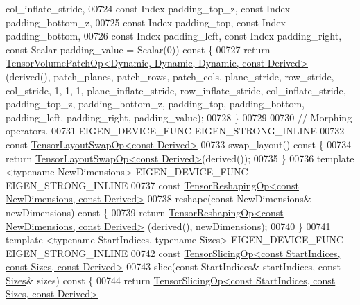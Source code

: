 \begin{DoxyCode}
      col\_inflate\_stride,
00724                            \textcolor{keyword}{const} Index padding\_top\_z, \textcolor{keyword}{const} Index padding\_bottom\_z,
00725                            \textcolor{keyword}{const} Index padding\_top, \textcolor{keyword}{const} Index padding\_bottom,
00726                            \textcolor{keyword}{const} Index padding\_left, \textcolor{keyword}{const} Index padding\_right, \textcolor{keyword}{const} Scalar padding\_value 
      = Scalar(0))\textcolor{keyword}{ const }\{
00727       \textcolor{keywordflow}{return} \hyperlink{class_eigen_1_1_tensor_volume_patch_op}{TensorVolumePatchOp<Dynamic, Dynamic, Dynamic, const Derived>}
      (derived(), patch\_planes, patch\_rows, patch\_cols, plane\_stride, row\_stride, col\_stride, 1, 1, 1, 
      plane\_inflate\_stride, row\_inflate\_stride, col\_inflate\_stride, padding\_top\_z, padding\_bottom\_z, padding\_top, 
      padding\_bottom, padding\_left, padding\_right, padding\_value);
00728     \}
00729 
00730     \textcolor{comment}{// Morphing operators.}
00731     EIGEN\_DEVICE\_FUNC EIGEN\_STRONG\_INLINE
00732     \textcolor{keyword}{const} \hyperlink{class_eigen_1_1_tensor_layout_swap_op}{TensorLayoutSwapOp<const Derived>}
00733     swap\_layout()\textcolor{keyword}{ const }\{
00734       \textcolor{keywordflow}{return} \hyperlink{class_eigen_1_1_tensor_layout_swap_op}{TensorLayoutSwapOp<const Derived>}(derived());
00735     \}
00736     \textcolor{keyword}{template} <\textcolor{keyword}{typename} NewDimensions> EIGEN\_DEVICE\_FUNC EIGEN\_STRONG\_INLINE
00737     \textcolor{keyword}{const} \hyperlink{class_eigen_1_1_tensor_reshaping_op}{TensorReshapingOp<const NewDimensions, const Derived>}
00738     reshape(\textcolor{keyword}{const} NewDimensions& newDimensions)\textcolor{keyword}{ const }\{
00739       \textcolor{keywordflow}{return} \hyperlink{class_eigen_1_1_tensor_reshaping_op}{TensorReshapingOp<const NewDimensions, const Derived>}
      (derived(), newDimensions);
00740     \}
00741     \textcolor{keyword}{template} <\textcolor{keyword}{typename} StartIndices, \textcolor{keyword}{typename} Sizes> EIGEN\_DEVICE\_FUNC EIGEN\_STRONG\_INLINE
00742     \textcolor{keyword}{const} \hyperlink{class_eigen_1_1_tensor_slicing_op}{TensorSlicingOp<const StartIndices, const Sizes, const Derived>}
00743     slice(\textcolor{keyword}{const} StartIndices& startIndices, \textcolor{keyword}{const} \hyperlink{struct_eigen_1_1_sizes}{Sizes}& sizes)\textcolor{keyword}{ const }\{
00744       \textcolor{keywordflow}{return} \hyperlink{class_eigen_1_1_tensor_slicing_op}{TensorSlicingOp<const StartIndices, const Sizes, const Derived>}

\end{DoxyCode}
